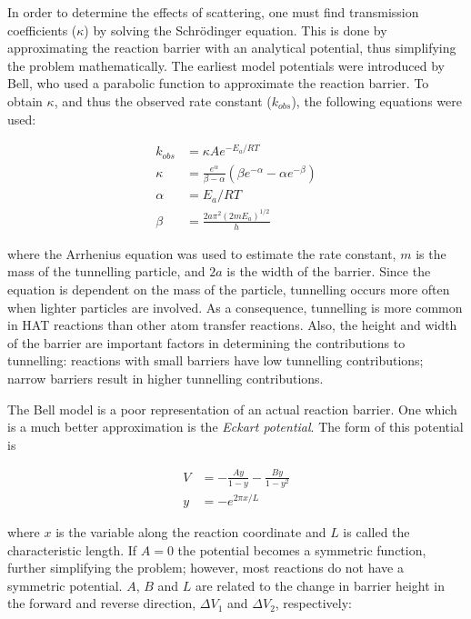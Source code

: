 In order to determine the effects of scattering, one must find transmission
coefficients ($\kappa$) by solving the Schr{\"o}dinger
equation.\cite{Griffiths2016} This is done by approximating the reaction
barrier with an analytical potential, thus simplifying the problem
mathematically. The earliest model potentials were introduced by Bell, who used
a parabolic function to approximate the reaction barrier.\cite{Bell1980} To
obtain $\kappa$, and thus the observed rate constant ($k_{obs}$), the following
equations were used:

\begin{align}
  k_{obs} &= \kappa A e^{-E_a/RT}  \\
\kappa &= \frac{e^\alpha}{\beta-\alpha} \left(\beta e^{-\alpha} - \alpha
  e^{-\beta} \right) \\
  \alpha &= E_a/RT \\
  \beta &= \frac{2a\pi^2(2mE_a)^{1/2}}{h}
\end{align}

\noindent where the Arrhenius equation was used to estimate the rate constant,
$m$ is the mass of the tunnelling particle, and $2a$ is the width of the
barrier. Since the equation is dependent on the mass of the particle,
tunnelling occurs more often when lighter particles are involved. As a
consequence, tunnelling is more common in HAT reactions than other atom
transfer reactions. Also, the height and width of the barrier are important
factors in determining the contributions to tunnelling: reactions with small
barriers have low tunnelling contributions; narrow barriers result in higher
tunnelling contributions.

The Bell model is a poor representation of an actual reaction barrier. One
which is a much better approximation is the \emph{Eckart
potential}.\cite{Johnston1962} The form of this potential is

\begin{align}
  V &= -\frac{Ay}{1-y} - \frac{By}{1-y^2} \\
  y &= -e^{2\pi x/L}
\end{align}

\noindent where $x$ is the variable along the reaction coordinate and $L$ is
called the characteristic length. If $A=0$ the potential becomes a symmetric
function, further simplifying the problem; however, most reactions do not have
a symmetric potential. $A$, $B$ and $L$ are related to the change in barrier
height in the forward and reverse direction, $\Delta V_1$ and $\Delta V_2$,
respectively:

